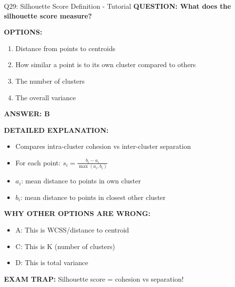 \documentclass[8pt]{beamer}
\begin{document}
	\begin{frame}{Q29: Silhouette Score Definition - Tutorial}
		\fontsize{6.5}{7.5}\selectfont
		\textbf{QUESTION: What does the silhouette score measure?}
		
		\vspace{0.1cm}
		\textbf{OPTIONS:}
		\begin{enumerate}
			\item Distance from points to centroids
			\item How similar a point is to its own cluster compared to others
			\item The number of clusters
			\item The overall variance
		\end{enumerate}
		
		\vspace{0.1cm}
		\textcolor{myblue}{\textbf{ANSWER: B}}
		
		\vspace{0.1cm}
		\textbf{DETAILED EXPLANATION:}
		\begin{itemize}
			\item Compares intra-cluster cohesion vs inter-cluster separation
			\item For each point: $s_i = \frac{b_i - a_i}{\max(a_i, b_i)}$
			\item $a_i$: mean distance to points in own cluster
			\item $b_i$: mean distance to points in closest other cluster
		\end{itemize}
		
		\vspace{0.1cm}
		\textcolor{myred}{\textbf{WHY OTHER OPTIONS ARE WRONG:}}
		\begin{itemize}
			\item \textcolor{myred}{A:} This is WCSS/distance to centroid
			\item \textcolor{myred}{C:} This is K (number of clusters)
			\item \textcolor{myred}{D:} This is total variance
		\end{itemize}
		
		\textcolor{myred}{\textbf{EXAM TRAP:}} Silhouette score = \textcolor{myblue}{cohesion vs separation}!
	\end{frame}
	
\end{document}
